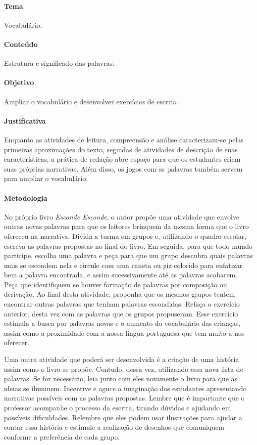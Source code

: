 \documentclass[11pt]{extarticle}
\begin{document}
\paragraph{Tema} Vocabulário. 

\paragraph{Conteúdo} Estrutura e significado das palavras.

\paragraph{Objetivo} Ampliar o vocabulário e desenvolver exercícios de escrita.

\paragraph{Justificativa} Enquanto as atividades de leitura, compreensão e análise caracterizam-se pelas primeiras aproximações do texto, seguidas de atividades de descrição de suas características, a prática de redação abre espaço para que os estudantes criem suas próprias narrativas. Além disso, os jogos com as palavras também servem para ampliar o vocabulário. 

\paragraph{Metodologia} No próprio livro \textit{Esconde Esconde}, o autor propõe uma atividade que envolve outras novas palavras para que os leitores brinquem da mesma forma que o livro ofereceu na narrativa. Divida a turma em grupos e, utilizando o quadro escolar, escreva as palavras propostas no final do livro. Em seguida, para que todo mundo participe, escolha uma palavra e peça para que um grupo descubra quais palavras mais se escondem nela e circule com uma caneta ou giz colorido para enfatizar bem a palavra encontrada, e assim sucessivamente até as palavras acabarem. Peça que identifiquem se houver formação de palavras por composição ou derivação. Ao final desta atividade, proponha que os mesmos grupos tentem encontrar outras palavras que tenham palavras escondidas. Refaça o exercício anterior, desta vez com as palavras que os grupos propuseram. Esse exercício estimula a busca por palavras novas e o aumento do vocabulário das crianças, assim como a proximidade com a nossa língua portuguesa que tem muito a nos oferecer.

Uma outra atividade que poderá ser desenvolvida é a criação de uma história assim como o livro se propõe. Contudo, dessa vez, utilizando essa nova lista de palavras. Se for necessário, leia junto com eles novamente o livro para que as ideias se iluminem. Incentive e aguce a imaginação dos estudantes apresentando narrativas possíveis com as palavras propostas. Lembre que é importante que o professor acompanhe o processo da escrita, tirando dúvidas e ajudando em possíveis dificuldades. Relembre que eles podem usar ilustrações para ajudar a contar essa história e estimule a realização de desenhos que comuniquem conforme a preferência de cada grupo.
\end{document}
